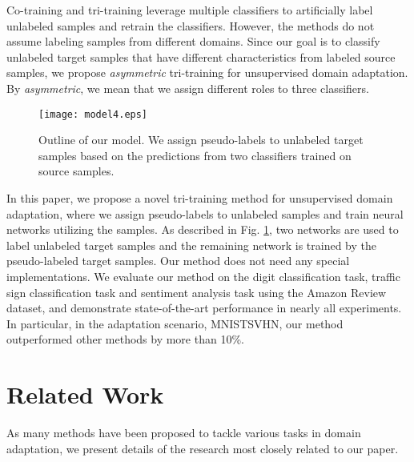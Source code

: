 \documentclass{article}
\begin{document}
Co-training and tri-training \cite{zhou2005tri} leverage multiple classifiers to artificially label unlabeled samples and retrain the classifiers. However, the methods do not assume labeling samples from different domains. Since our goal is to classify unlabeled target samples that have different characteristics from labeled source samples, we propose \textit{asymmetric} tri-training for unsupervised domain adaptation. By \textit{asymmetric}, we mean that we assign different roles to three classifiers. 
\begin{figure}[t]
  \begin{center}
   \texttt{[image: model4.eps]}
  \end{center}
\caption{Outline of our model. We assign pseudo-labels to unlabeled target samples based on the predictions from two classifiers trained on source samples.}
    \label{fig:tri_train}
\end{figure}

In this paper, we propose a novel tri-training method for unsupervised domain adaptation, where we assign pseudo-labels to unlabeled samples and train neural networks utilizing the samples. As described in Fig. \ref{fig:tri_train}, two networks are used to label unlabeled target samples and the remaining network is trained by the pseudo-labeled target samples. Our method does not need any special implementations.
We evaluate our method on the digit classification task, traffic sign classification task and sentiment analysis task using the Amazon Review dataset, and demonstrate state-of-the-art performance in nearly all experiments. In particular, in the adaptation scenario, MNISTSVHN, our method outperformed other methods by more than 10\%. 
\vspace{-3mm}
\section{Related Work}
As many methods have been proposed to tackle various tasks in domain adaptation, we present details of the research most closely related to our paper.
\end{document}
